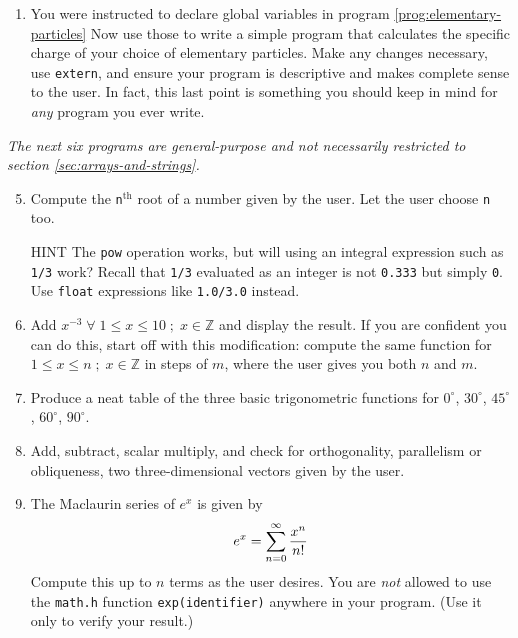 \documentclass[11pt,oneside]{article}
\begin{document}
{{{{{{{{{{{{\begin{enumerate}[label=\arabic*.]
Next, use the global functions from this program to write another program that computes the determinant of a matrix that the user provides.

\item You were instructed to declare global variables in program \ref{prog:elementary-particles} Now use those to write a simple program that calculates the specific charge of your choice of elementary particles. Make any changes necessary, use \verb+extern+, and ensure your program is descriptive and makes complete sense to the user. In fact, this last point is something you should keep in mind for \textit{any} program you ever write.\\
\end{enumerate}

\textit{The next six programs are general-purpose and not necessarily restricted to section \ref{sec:arrays-and-strings}.}

\begin{enumerate}
\setcounter{enumi}{4}
\item Compute the \verb+n+$^\textrm{th}$ root of a number given by the user. Let the user choose \verb+n+ too.

{\footnotesize\sffamily{} HINT} The \verb+pow+ operation works, but will using an integral expression such as \verb+1/3+ work? Recall that \verb+1/3+ evaluated as an integer is not \verb+0.333+ but simply \verb+0+. Use \verb+float+ expressions like \verb+1.0/3.0+ instead.

\item Add $x^{-3} \; \forall \; 1 \leq x \leq 10 \; ; \; x \in \mathbb{Z}$ and display the result. If you are confident you can do this, start off with this modification: compute the same function for $1 \leq x \leq n \; ; \; x \in \mathbb{Z}$ in steps of $m$, where the user gives you both $n$ and $m$.

\item Produce a neat table of the three basic trigonometric functions for $0^\circ$, $30^\circ$, $45^\circ$, $60^\circ$, $90^\circ$.

\item Add, subtract, scalar multiply, and check for orthogonality, parallelism or obliqueness, two three-dimensional vectors given by the user.

\item The Maclaurin series of $e^x$ is given by $$e^x = \sum\displaylimits_{n=0}^\infty {x^n \over n!}$$Compute this up to $n$ terms as the user desires. You are \textit{not} allowed to use the \verb+math.h+ function \verb+exp(identifier)+ anywhere in your program. (Use it only to verify your result.)


\end{enumerate}}}}}}}}}}}}}
\end{document}
